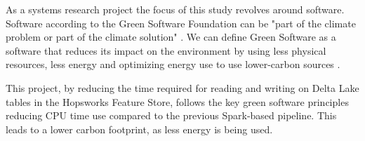As a systems research project the focus of this study revolves around software. Software according to the Green Software Foundation \cite{GreenSoftwareFoundation} can be "part of the climate problem or part of the climate solution" \cite{WhatGreenSoftware2021}. We can define Green Software as a software that reduces its impact on the environment by using less physical resources, less energy and optimizing energy use to use lower-carbon sources \cite{WhatGreenSoftware2021}.

This project, by reducing the time required for reading and writing on Delta Lake tables in the Hopsworks Feature Store, follows the key green software principles reducing CPU time use compared to the previous Spark-based pipeline. This leads to a lower carbon footprint, as less energy is being used.